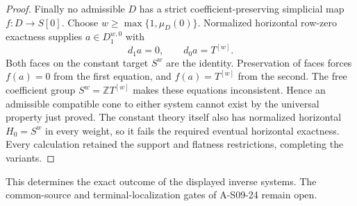 \begin{proof}
Finally no admissible $D$ has a strict coefficient-preserving
simplicial map $f:D\to S[0]$.  Choose
$w\geq\max\{1,\mu_D(0)\}$.
Normalized horizontal row-zero exactness supplies
$a\in D_1^{w,0}$ with
\[
                      d_1a=0,\qquad d_0a=T^{[w]}.
 \tag{S09.128}
\]
Both faces on the constant target $S^w$ are the identity.
Preservation of faces forces $f(a)=0$ from the first
equation, and $f(a)=T^{[w]}$ from the second.
The free coefficient group $S^w=\mathbb Z T^{[w]}$
makes these equations inconsistent.
Hence an admissible compatible cone to either system
cannot exist by the universal property just proved.
The constant theory itself also has normalized horizontal
$H_0=S^w$ in every weight, so it fails the required eventual
horizontal exactness.
Every calculation retained the support and flatness
restrictions, completing the variants.
\end{proof}

This determines the exact outcome of the displayed inverse
systems.  The common-source and terminal-localization gates
of A-S09-24 remain open.
